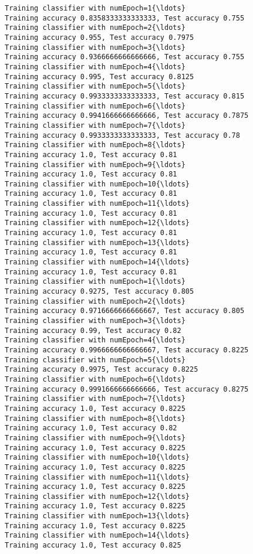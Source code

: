 \documentclass[11pt]{article}
\begin{document}
    \begin{Verbatim}[commandchars=\\\{\}]
Training classifier with numEpoch=1{\ldots}
Training accuracy 0.8358333333333333, Test accuracy 0.755
Training classifier with numEpoch=2{\ldots}
Training accuracy 0.955, Test accuracy 0.7975
Training classifier with numEpoch=3{\ldots}
Training accuracy 0.9366666666666666, Test accuracy 0.755
Training classifier with numEpoch=4{\ldots}
Training accuracy 0.995, Test accuracy 0.8125
Training classifier with numEpoch=5{\ldots}
Training accuracy 0.9933333333333333, Test accuracy 0.815
Training classifier with numEpoch=6{\ldots}
Training accuracy 0.9941666666666666, Test accuracy 0.7875
Training classifier with numEpoch=7{\ldots}
Training accuracy 0.9933333333333333, Test accuracy 0.78
Training classifier with numEpoch=8{\ldots}
Training accuracy 1.0, Test accuracy 0.81
Training classifier with numEpoch=9{\ldots}
Training accuracy 1.0, Test accuracy 0.81
Training classifier with numEpoch=10{\ldots}
Training accuracy 1.0, Test accuracy 0.81
Training classifier with numEpoch=11{\ldots}
Training accuracy 1.0, Test accuracy 0.81
Training classifier with numEpoch=12{\ldots}
Training accuracy 1.0, Test accuracy 0.81
Training classifier with numEpoch=13{\ldots}
Training accuracy 1.0, Test accuracy 0.81
Training classifier with numEpoch=14{\ldots}
Training accuracy 1.0, Test accuracy 0.81
Training classifier with numEpoch=1{\ldots}
Training accuracy 0.9275, Test accuracy 0.805
Training classifier with numEpoch=2{\ldots}
Training accuracy 0.9716666666666667, Test accuracy 0.805
Training classifier with numEpoch=3{\ldots}
Training accuracy 0.99, Test accuracy 0.82
Training classifier with numEpoch=4{\ldots}
Training accuracy 0.9966666666666667, Test accuracy 0.8225
Training classifier with numEpoch=5{\ldots}
Training accuracy 0.9975, Test accuracy 0.8225
Training classifier with numEpoch=6{\ldots}
Training accuracy 0.9991666666666666, Test accuracy 0.8275
Training classifier with numEpoch=7{\ldots}
Training accuracy 1.0, Test accuracy 0.8225
Training classifier with numEpoch=8{\ldots}
Training accuracy 1.0, Test accuracy 0.82
Training classifier with numEpoch=9{\ldots}
Training accuracy 1.0, Test accuracy 0.8225
Training classifier with numEpoch=10{\ldots}
Training accuracy 1.0, Test accuracy 0.8225
Training classifier with numEpoch=11{\ldots}
Training accuracy 1.0, Test accuracy 0.8225
Training classifier with numEpoch=12{\ldots}
Training accuracy 1.0, Test accuracy 0.8225
Training classifier with numEpoch=13{\ldots}
Training accuracy 1.0, Test accuracy 0.8225
Training classifier with numEpoch=14{\ldots}
Training accuracy 1.0, Test accuracy 0.825

    \end{Verbatim}
\end{document}
